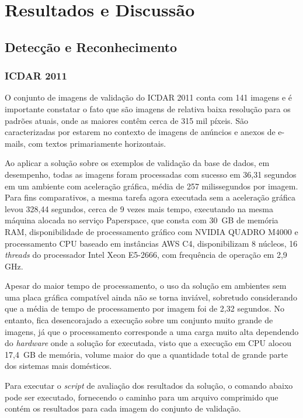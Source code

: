 \chapter{Resultados e Discussão}\label{cap:resultados}

\section{Detecção e Reconhecimento}
\subsection{ICDAR 2011}\label{sec:results_icdar_2011}
O conjunto de imagens de validação do ICDAR 2011 conta com 141 imagens e é importante constatar o fato que são imagens de 
relativa baixa resolução para os padrões atuais, onde as maiores contêm cerca de 315 mil píxeis. São caracterizadas por 
estarem no contexto de imagens de anúncios e anexos de e-mails, com textos primariamente horizontais.

Ao aplicar a solução sobre os exemplos de validação da base de dados, em desempenho, todas as imagens foram processadas com 
sucesso em 36,31 segundos em um ambiente com aceleração gráfica, média de 257 milissegundos por imagem. Para fins comparativos, 
a mesma tarefa agora executada sem a aceleração gráfica levou 328,44 segundos, cerca de 9 vezes mais tempo, executando na 
mesma máquina alocada no serviço Paperspace, que consta com 30 GB de memória RAM, disponibilidade de processamento gráfico 
com NVIDIA QUADRO M4000 e processamento CPU baseado em instâncias AWS C4, disponibilizam 8 núcleos, 16 \textit{threads} do 
processador Intel Xeon E5-2666, com frequência de operação em 2,9 GHz.

Apesar do maior tempo de processamento, o uso da solução em ambientes sem uma placa gráfica compatível ainda não se torna 
inviável, sobretudo considerando que a média de tempo de processamento por imagem foi de 2,32 segundos. No entanto, fica 
desencorajado a execução sobre um conjunto muito grande de imagens, já que o processamento corresponde a uma carga muito 
alta dependendo do \textit{hardware} onde a solução for executada, visto que a execução em CPU alocou 17,4 GB de memória, 
volume maior do que a quantidade total de grande parte dos sistemas mais domésticos.

Para executar o \textit{script} de avaliação dos resultados da solução, o comando abaixo pode ser executado, fornecendo o 
caminho para um arquivo comprimido que contém os resultados para cada imagem do conjunto de validação.

